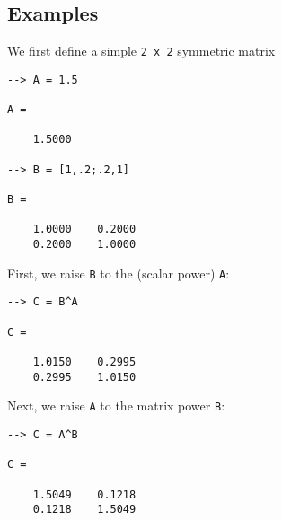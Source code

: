 \subsection{Examples}

We first define a simple \verb|2 x 2| symmetric matrix
\begin{verbatim}
--> A = 1.5

A = 

    1.5000 

--> B = [1,.2;.2,1]

B = 

    1.0000    0.2000 
    0.2000    1.0000 
\end{verbatim}
First, we raise \verb|B| to the (scalar power) \verb|A|:
\begin{verbatim}
--> C = B^A

C = 

    1.0150    0.2995 
    0.2995    1.0150 
\end{verbatim}
Next, we raise \verb|A| to the matrix power \verb|B|:
\begin{verbatim}
--> C = A^B

C = 

    1.5049    0.1218 
    0.1218    1.5049 
\end{verbatim}
